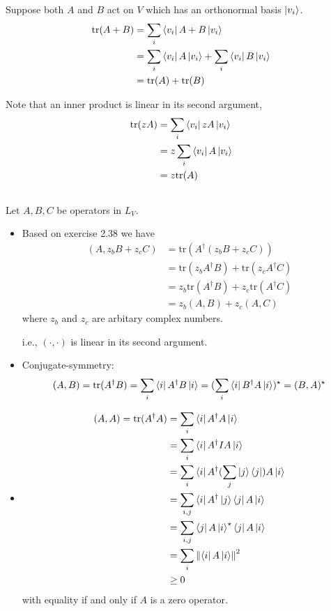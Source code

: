 \documentclass{homeworg}
\begin{document}
\exercise*
Suppose both $A$ and $B$ act on $V$ which has an orthonormal basis $\ket{v_i}$.
\begin{align}
    \text{tr}(A+B)&=\sum_i\bra{v_i}A+B\ket{v_i}\nonumber\\
    &=\sum_i\bra{v_i}A\ket{v_i}+\sum_i\bra{v_i}B\ket{v_i}\nonumber\\
    &=\text{tr}(A)+\text{tr}(B)\nonumber
\end{align}

Note that an inner product is linear in its second argument,
\begin{align}
    \text{tr}(zA)&=\sum_i\bra{v_i}zA\ket{v_i}\nonumber\\
    &=z\sum_i\bra{v_i}A\ket{v_i}\nonumber\\
    &=z\text{tr}(A)\nonumber
\end{align}

\exercise*
\subsection{}
Let $A,B,C$ be operators in $L_V$.
\begin{itemize}
    \item Based on exercise 2.38 we have
    \begin{align}
        (A,z_bB+z_cC)&=\text{tr}(A^\dagger (z_bB+z_cC))\nonumber\\
        &=\text{tr}(z_b A^\dagger B)+\text{tr}(z_c A^\dagger C)\nonumber\\
        &=z_b\text{tr}(A^\dagger B)+z_c\text{tr}(A^\dagger C)\nonumber\\
        &=z_b(A,B)+z_c(A,C)\nonumber
    \end{align}
    where $z_b$ and $z_c$ are arbitary complex numbers.
    
    i.e., $(\cdot,\cdot)$ is linear in its second argument.
    \item Conjugate-symmetry:
    \[(A,B)=\text{tr}(A^\dagger B)=\sum_i \bra{i}A^\dagger B\ket{i}=(\sum_i \bra{i}B^\dagger A\ket{i})^\star=(B,A)^\star\]
    \item 
    \begin{align}
    (A,A)=\text{tr}(A^\dagger A)&=\sum_i\bra{i}A^\dagger A\ket{i}\nonumber\\
    &=\sum_i\bra{i}A^\dagger I A\ket{i}\nonumber\\
    &=\sum_i\bra{i}A^\dagger (\sum_j \ket{j}\bra{j})A\ket{i}\nonumber\\\
    &=\sum_{i,j}\bra{i}A^\dagger \ket{j}\bra{j}A\ket{i}\nonumber\\
    &=\sum_{i,j}\bra{j}A \ket{i}^\star\bra{j}A\ket{i}\nonumber\\
    &=\sum_{i}\left\|\bra{i}A\ket{i}\right\|^2\nonumber\\
    &\geq 0\nonumber
    \end{align}
    with equality if and only if $A$ is a zero operator.
\end{itemize}
\end{document}
